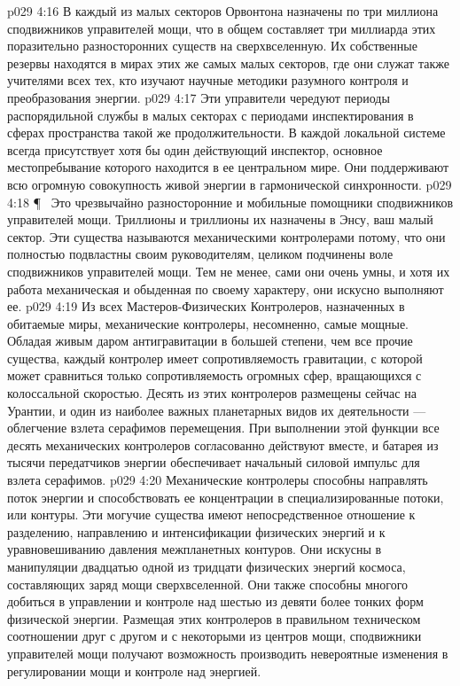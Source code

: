 \vs p029 4:16 В каждый из малых секторов Орвонтона назначены по три миллиона сподвижников управителей мощи, что в общем составляет три миллиарда этих поразительно разносторонних существ на сверхвселенную. Их собственные резервы находятся в мирах этих же самых малых секторов, где они служат также учителями всех тех, кто изучают научные методики разумного контроля и преобразования энергии.
\vs p029 4:17 Эти управители чередуют периоды распорядильной службы в малых секторах с периодами инспектирования в сферах пространства такой же продолжительности. В каждой локальной системе всегда присутствует хотя бы один действующий инспектор, основное местопребывание которого находится в ее центральном мире. Они поддерживают всю огромную совокупность живой энергии в гармонической синхронности.
\vs p029 4:18 \P\ \bibnobreakspace {} Это чрезвычайно разносторонние и мобильные помощники сподвижников управителей мощи. Триллионы и триллионы их назначены в Энсу, ваш малый сектор. Эти существа называются механическими контролерами потому, что они полностью подвластны своим руководителям, целиком подчинены воле сподвижников управителей мощи. Тем не менее, сами они очень умны, и хотя их работа механическая и обыденная по своему характеру, они искусно выполняют ее.
\vs p029 4:19 Из всех Мастеров\hyp{}Физических Контролеров, назначенных в обитаемые миры, механические контролеры, несомненно, самые мощные. Обладая живым даром антигравитации в большей степени, чем все прочие существа, каждый контролер имеет сопротивляемость гравитации, с которой может сравниться только сопротивляемость огромных сфер, вращающихся с колоссальной скоростью. Десять из этих контролеров размещены сейчас на Урантии, и один из наиболее важных планетарных видов их деятельности --- облегчение взлета серафимов перемещения. При выполнении этой функции все десять механических контролеров согласованно действуют вместе, и батарея из тысячи передатчиков энергии обеспечивает начальный силовой импульс для взлета серафимов.
\vs p029 4:20 Механические контролеры способны направлять поток энергии и способствовать ее концентрации в специализированные потоки, или контуры. Эти могучие существа имеют непосредственное отношение к разделению, направлению и интенсификации физических энергий и к уравновешиванию давления межпланетных контуров. Они искусны в манипуляции двадцатью одной из тридцати физических энергий космоса, составляющих заряд мощи сверхвселенной. Они также способны многого добиться в управлении и контроле над шестью из девяти более тонких форм физической энергии. Размещая этих контролеров в правильном техническом соотношении друг с другом и с некоторыми из центров мощи, сподвижники управителей мощи получают возможность производить невероятные изменения в регулировании мощи и контроле над энергией.
